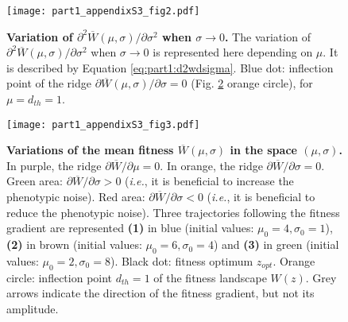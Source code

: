 \begin{figure}[!h]
\begin{adjustwidth}{-0in}{0in}
\centering
\texttt{[image: part1\_appendixS3\_fig2.pdf]}
\end{adjustwidth}
\caption[Variation of $\partial^2 W(\mu,\sigma)/\partial \sigma^2$ when $\sigma \rightarrow 0$.]{
\textbf{Variation of $\partial^2 \overline{W}(\mu,\sigma)/\partial \sigma^2$ when $\sigma \rightarrow 0$.}
The variation of $\partial^2 \overline{W}(\mu,\sigma)/\partial \sigma^2$ when $\sigma \rightarrow 0$ is represented here depending on $\mu$. It is described by Equation \ref{eq:part1:d2wdsigma}. Blue dot: inflection point of the ridge $\partial \overline{W}(\mu,\sigma)/\partial \sigma = 0$ (Fig. \ref{part1:appendixS3:fig3} orange circle), for $\mu = d_{th} = 1$.
}
\label{part1:appendixS3:fig2}
\end{figure}

\begin{figure}[!h]
\begin{adjustwidth}{-0in}{0in}
\centering
\texttt{[image: part1\_appendixS3\_fig3.pdf]}
\end{adjustwidth}
\caption[Variations of the mean fitness $\overline{W}(\mu,\sigma)$ in the space $(\mu,\sigma)$.]{\textbf{Variations of the mean fitness $\overline{W}(\mu,\sigma)$ in the space $(\mu,\sigma)$.}
In purple, the ridge $\partial \overline{W}/\partial \mu=0$. In orange, the ridge $\partial \overline{W}/\partial \sigma=0$. Green area: $\partial \overline{W}/\partial \sigma > 0$ (\textit{i.e.}, it is beneficial to increase the phenotypic noise). Red area: $\partial \overline{W}/\partial \sigma < 0$ (\textit{i.e.}, it is beneficial to reduce the phenotypic noise). Three trajectories following the fitness gradient are represented \textbf{(1)} in blue (initial values: $\mu_0=4, \sigma_0=1$), \textbf{(2)} in brown (initial values: $\mu_0=6, \sigma_0=4$) and \textbf{(3)} in green (initial values: $\mu_0=2, \sigma_0=8$). Black dot: fitness optimum $z_{opt}$. Orange circle: inflection point $d_{th}=1$ of the fitness landscape $W(z)$. Grey arrows indicate the direction of the fitness gradient, but not its amplitude.
}
\label{part1:appendixS3:fig3}
\end{figure}


